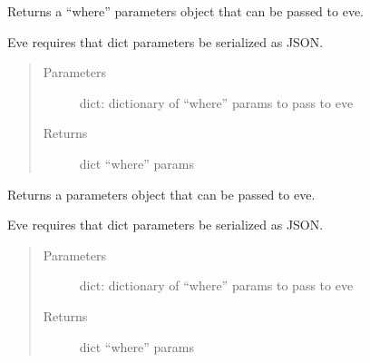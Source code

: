 \documentclass[letterpaper,10pt,english]{sphinxmanual}
\begin{document}

\begin{fulllineitems}
\label{\detokenize{autoapi/pine/backend/data/service/index:pine.backend.data.service.where_params}}
Returns a “where” parameters object that can be passed to eve.

Eve requires that dict parameters be serialized as JSON.
\begin{quote}\begin{description}
\item[{Parameters}] \leavevmode
{} \textendash{} dict: dictionary of “where” params to pass to eve

\item[{Returns}] \leavevmode
dict “where” params

\end{description}\end{quote}

\end{fulllineitems}


\begin{fulllineitems}
\label{\detokenize{autoapi/pine/backend/data/service/index:pine.backend.data.service.params}}
Returns a parameters object that can be passed to eve.

Eve requires that dict parameters be serialized as JSON.
\begin{quote}\begin{description}
\item[{Parameters}] \leavevmode
{} \textendash{} dict: dictionary of “where” params to pass to eve

\item[{Returns}] \leavevmode
dict “where” params

\end{description}\end{quote}

\end{fulllineitems}
\end{document}
